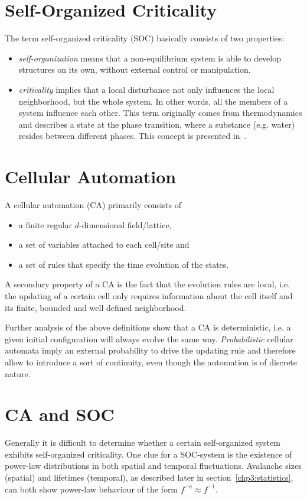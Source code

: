 \section{Self-Organized Criticality}
The term self-organized criticality (SOC) basically consists of two properties:
\begin{itemize}
\item \emph{self-organization} means that a non-equilibrium system is able to develop structures on its own, without external control or manipulation.
\item \emph{criticality} implies that a local disturbance not only influences the local neighborhood, but the whole system. In other words, all the members of a system influence each other. This term originally comes from thermodynamics and describes a state at the phase transition, where a substance (e.g. water) resides between different phases. This concept is presented in~\cite{1overf}.
\end{itemize}

\section{Cellular Automation}
A cellular automation (CA) primarily consists of
\begin{itemize}
\item a finite regular $d$-dimensional field/lattice,
\item a set of variables attached to each cell/site and
\item a set of rules that specify the time evolution of the states.
\end{itemize}
A secondary property of a CA is the fact that the evolution rules are local, i.e. the updating of a certain cell only requires information about the cell itself and its finite, bounded and well defined neighborhood.

Further analysis of the above definitions show that a CA is deterministic, i.e. a given initial configuration will always evolve the same way. \emph{Probabilistic} cellular automata imply an external probability to drive the updating rule and therefore allow to introduce a sort of continuity, even though the automation is of discrete nature.

\section{CA and SOC}\label{sec:CAandSOC}
Generally it is difficult to determine whether a certain self-organized system exhibits self-organized criticality. One clue for a SOC-system is the existence of power-law distributions in both spatial and temporal fluctuations. Avalanche sizes (spatial) and lifetimes (temporal), as described later in section~\ref{chp3:statistics}, can both show power-law behaviour of the form $f^{-a} \approx f^{-1}$.

